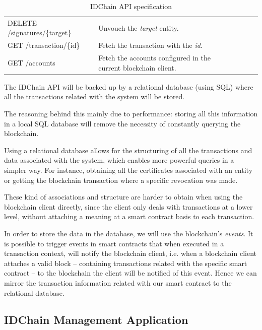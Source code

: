 {\begin{table}[h]
\begin{tabular}{|l|l|lll}
    DELETE /signatures/\{target\}   & Unvouch the \textit{target} entity.                      &  &  &  \\ \cline{1-2}

    GET /transaction/\{id\}         & Fetch the transaction with the \textit{id}.                      &  &  &  \\ \cline{1-2}

    GET /accounts                   & Fetch the accounts configured in the current blockchain client.                        &  &  & \\ \cline{1-2}
  \end{tabular}%
  \caption{IDChain API specification}
\label{table:idchain-api-spec}
\end{table}

The IDChain API will be backed up by a relational database (using \ac{SQL}) where all the transactions related with the system will be stored.

The reasoning behind this mainly due to performance: storing all this information in a local \ac{SQL} database will remove the necessity of constantly querying the blockchain.

Using a relational database allows for the structuring of all the transactions and data associated with the system, which enables more powerful queries in a simpler way. For instance, obtaining all the certificates associated with an entity or getting the blockchain transaction where a specific revocation was made.

These kind of associations and structure are harder to obtain when using the blockchain client directly, since the client only deals with transactions at a lower level, without attaching a meaning at a smart contract basis to each transaction.

In order to store the data in the database, we will use the blockchain's \textit{events}.
It is possible to trigger events in smart contracts that when executed in a transaction context, will notify the blockchain client, i.e. when a blockchain client attaches a valid block  – containing transactions related with the specific smart contract – to the blockchain the client will be notified of this event.
Hence we can mirror the transaction information related with our smart contract to the relational database.

\subsection{IDChain Management Application}
\label{subsection:idchain-app}

}
